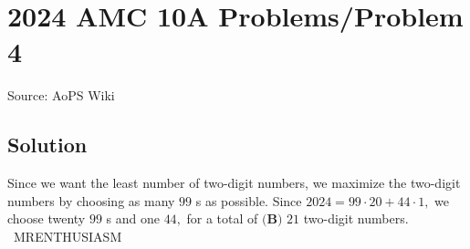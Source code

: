 \documentclass[12pt]{article}
\begin{document}
\section*{{2024 AMC 10A Problems/Problem 4}}
Source: AoPS Wiki

\subsection*{Solution}
Since we want the least number of two-digit numbers, we maximize the two-digit numbers by choosing as many $99$ s as possible. Since $2024=99\cdot20+44\cdot1,$ we choose twenty $99$ s and one $44,$ for a total of $\boxed{\textbf{(B) }21}$ two-digit numbers. ~MRENTHUSIASM
\end{document}
